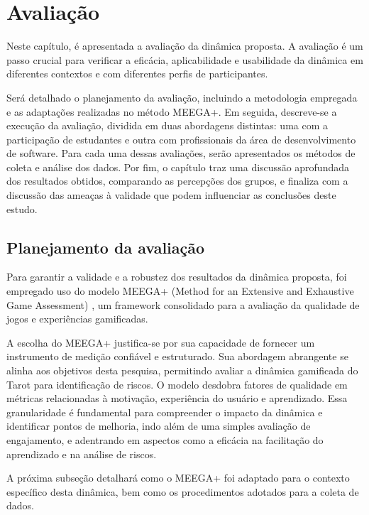 \documentclass[
	12pt,
	openright,
	twoside,
	a4paper,
	english,
	brazil
	]{abntex2}
\begin{document}

\chapter{Avaliação}

Neste capítulo, é apresentada a avaliação da dinâmica proposta. A avaliação é um passo crucial para verificar a eficácia, aplicabilidade e usabilidade da dinâmica em diferentes contextos e com diferentes perfis de participantes.

Será detalhado o planejamento da avaliação, incluindo a metodologia empregada e as adaptações realizadas no método MEEGA+. Em seguida, descreve-se a execução da avaliação, dividida em duas abordagens distintas: uma com a participação de estudantes e outra com profissionais da área de desenvolvimento de software. Para cada uma dessas avaliações, serão apresentados os métodos de coleta e análise dos dados. Por fim, o capítulo traz uma discussão aprofundada dos resultados obtidos, comparando as percepções dos grupos, e finaliza com a discussão das ameaças à validade que podem influenciar as conclusões deste estudo.

\section{Planejamento da avaliação}

Para garantir a validade e a robustez dos resultados da dinâmica proposta, foi empregado uso do modelo MEEGA+ (Method for an Extensive and Exhaustive Game Assessment) \cite{MEEGA}, um framework consolidado para a avaliação da qualidade de jogos e experiências gamificadas.

A escolha do MEEGA+ justifica-se por sua capacidade de fornecer um instrumento de medição confiável e estruturado. Sua abordagem abrangente se alinha aos objetivos desta pesquisa, permitindo avaliar a dinâmica gamificada do Tarot para identificação de riscos. O modelo desdobra fatores de qualidade em métricas relacionadas à motivação, experiência do usuário e aprendizado. Essa granularidade é fundamental para compreender o impacto da dinâmica e identificar pontos de melhoria, indo além de uma simples avaliação de engajamento, e adentrando em aspectos como a eficácia na facilitação do aprendizado e na análise de riscos.

A próxima subseção detalhará como o MEEGA+ foi adaptado para o contexto específico desta dinâmica, bem como os procedimentos adotados para a coleta de dados.
\end{document}
